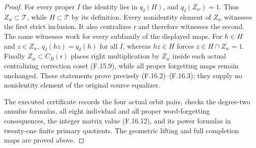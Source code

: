 \begin{proof}
For every proper $I$ the identity lies in
$q_I(H)$, and $q_I(Z_w)=1$.
Thus $Z_w\subset\mathcal T$, while
$H\subset\mathcal T$ by its definition.
Every nonidentity element of $Z_w$
witnesses the first strict inclusion.
It also centralizes $\mathsf r$ and
therefore witnesses the second.
The same witnesses work for every
subfamily of the displayed maps.
For $h\in H$ and $z\in Z_w$,
$q_I(hz)=q_I(h)$ for all $I$, whereas
$hz\in H$ forces $z\in H\cap Z_w=1$.
Finally $Z_w\subset C_B(\mathsf r)$
places right multiplication by $Z_w$
inside each actual centralizing
correction coset (F.15.9), while all
proper forgetting maps remain unchanged.
These statements prove precisely
(F.16.2)--(F.16.3); they supply no
nonidentity element of the original
source equalizer.

The executed certificate
records the four actual orbit pairs,
checks the degree-two annulus formulas,
all eight individual and all proper
word-forgetting consequences, the
integer matrix value (F.16.12), and
its power formulas in twenty-one
finite primary quotients.
The geometric lifting and full
completion maps are proved above.
\end{proof}
